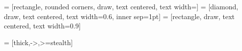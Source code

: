 \usetikzlibrary{shapes, arrows}
\usetikzlibrary{positioning}
\usetikzlibrary{automata}

\newlength{\tikztextwidth}
\setlength{\tikztextwidth}{0.2\columnwidth}

\newlength{\tikzdistance}
\setlength{\tikzdistance}{0.35\columnwidth}

 = [rectangle, rounded corners, draw, text centered,
text width=\tikztextwidth]
 = [diamond, draw, text centered,
text width=0.6\tikztextwidth, inner sep=1pt]
 = [rectangle, draw, text centered,
text width=0.9\tikztextwidth]

 = [thick,->,>=stealth]
